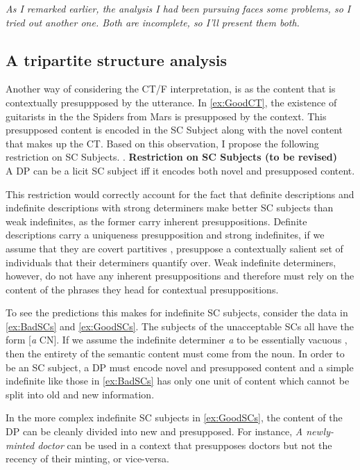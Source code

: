 \documentclass[letterpaper]{article}
\begin{document}
\begin{center}
  \textit{As I remarked earlier, the analysis I had been pursuing faces some problems, so I tried out another one.
    Both are incomplete, so I'll present them both.
  }
\end{center}

\subsection{A tripartite structure analysis}
Another way of considering the CT/F interpretation, is  as the content that is contextually presuppposed by the utterance.
In \ref{ex:GoodCT}, the existence of guitarists in the the Spiders from Mars is presupposed by the context.
This presupposed content is encoded in the SC Subject along with the novel content that makes up the CT.
Based on this observation, I propose the following restriction on SC Subjects.
\ex. \textbf{Restriction on SC Subjects (to be revised)}\\
A DP can be a licit SC subject iff it encodes both novel and presupposed content.

This restriction would correctly account for the fact that definite descriptions and indefinite descriptions with strong determiners make better SC subjects than weak indefinites, as the former carry inherent presuppositions.
Definite descriptions carry a uniqueness presupposition and strong indefinites, if we assume that they are covert partitives \parencite{fintel2004minimal}, presuppose a contextually salient set of individuals that their determiners quantify over.
Weak indefinite determiners, however, do not have any inherent presuppositions and therefore must rely on the content of the phrases they head for contextual presuppositions.

To see the predictions this makes for indefinite SC subjects, consider the data in \ref{ex:BadSCs} and \ref{ex:GoodSCs}.
The subjects of the unacceptable SCs all have the form [\textit{a} CN].
If we assume the indefinite determiner \textit{a} to be essentially vacuous \parencite{heim1982semantics}, then the entirety of the semantic content must come from the noun.
In order to be an SC subject, a DP must encode novel and presupposed content and a simple indefinite like those in \ref{ex:BadSCs} has only one unit of content which cannot be split into old and new information.

In the more complex indefinite SC subjects in \ref{ex:GoodSCs}, the content of the DP can be cleanly divided into new and presupposed.
For instance, \textit{A newly-minted doctor} can be used in a context that presupposes doctors but not the recency of their minting, or vice-versa.
\end{document}
